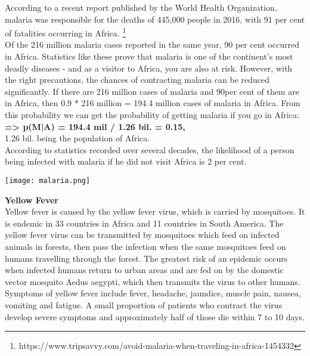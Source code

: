 \tab According to a recent report published by the World Health Organization, malaria was responsible for the deaths of 445,000 people in 2016, with 91 per cent of fatalities occurring in Africa. \footnote{https://www.tripsavvy.com/avoid-malaria-when-traveling-in-africa-1454332}\\  

\tab Of the 216 million malaria cases reported in the same year, 90 per cent occurred in Africa. Statistics like these prove that malaria is one of the continent's most deadly diseases - and as a visitor to Africa, you are also at risk. However, with the right precautions, the chances of contracting malaria can be reduced significantly. If there are 216 million cases of malaria and 90per cent of them are in Africa, then 0.9 * 216 million = 194.4 million cases of malaria in Africa. From this probability we can get the probability of getting malaria if you go in Africa:\\
		\tab \tab \textbf{=> p(M|A) = 194.4 mil / 1.26 bil. = 0.15,} \\
1.26 bil. being the population of Africa.\\

\tab According to statistics recorded over several decades, the likelihood of a person being infected with malaria if he did not visit Africa is 2 per cent.\\

\begin{center}
  	\texttt{[image: malaria.png]}
\end{center}

\textbf{Yellow Fever}\\
\tab Yellow fever is caused by the yellow fever virus, which is carried by mosquitoes. It is endemic in 33 countries in Africa and 11 countries in South America. The yellow fever virus can be transmitted by mosquitoes which feed on infected animals in forests, then pass the infection when the same mosquitoes feed on humans travelling through the forest. The greatest risk of an epidemic occurs when infected humans return to urban areas and are fed on by the domestic vector mosquito Aedus aegypti, which then transmits the virus to other humans.\\

\tab Symptoms of yellow fever include fever, headache, jaundice, muscle pain, nausea, vomiting and fatigue. 
 A small proportion of patients who contract the virus develop severe symptoms and approximately half of those die within 7 to 10 days. \\

